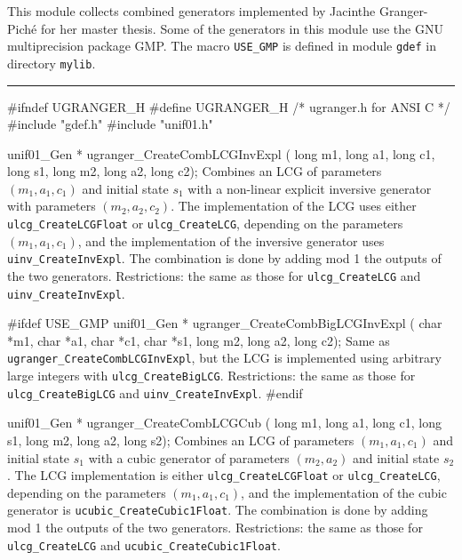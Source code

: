 
This module collects combined generators implemented by
Jacinthe Granger-Pich\'e for her master thesis. 
Some of the generators in this module use the GNU multiprecision package GMP. 
The macro {\tt USE\_GMP} is defined in module {\tt gdef} in directory
{\tt mylib}. %


\bigskip
\hrule
\code\hide
#ifndef UGRANGER_H
#define UGRANGER_H
/* ugranger.h for ANSI C */
\endhide
#include "gdef.h"
#include "unif01.h"


unif01_Gen * ugranger_CreateCombLCGInvExpl (
   long m1, long a1, long c1, long s1, long m2, long a2, long c2);
\endcode
 \tab
   Combines an  LCG of parameters $(m_1, a_1, c_1)$ and initial
   state $s_1$ with a non-linear explicit  inversive  generator  
   with parameters $(m_2, a_2, c_2)$. The implementation of the LCG uses either
   {\tt ulcg\_CreateLCGFloat} or {\tt ulcg\_CreateLCG},
   depending on the parameters
   $(m_1, a_1, c_1)$, and the implementation of the inversive generator uses 
   {\tt uinv\_CreateInvExpl}. The combination is done by adding mod 1 the
   outputs of the two generators.
   Restrictions: the same as those for {\tt ulcg\_CreateLCG} and
   {\tt uinv\_CreateInvExpl}.
 \endtab
\code


#ifdef USE_GMP
   unif01_Gen * ugranger_CreateCombBigLCGInvExpl (
      char *m1, char *a1, char *c1, char *s1, long m2, long a2, long c2);
\endcode
 \tab 
   Same as {\tt ugranger\_CreateCombLCGInvExpl}, but the LCG is implemented 
   using arbitrary large integers with {\tt ulcg\_CreateBigLCG}.  
   Restrictions: the same as those for {\tt ulcg\_CreateBigLCG} and
   {\tt uinv\_CreateInvExpl}.  
 \endtab
\code
#endif


unif01_Gen * ugranger_CreateCombLCGCub (
   long m1, long a1, long c1, long s1, long m2, long a2, long s2);
\endcode
 \tab Combines an LCG of parameters $(m_1, a_1, c_1)$ and initial
   state $s_1$ with a  cubic generator of parameters $(m_2, a_2)$ and
   initial state $s_2$. The  LCG implementation is either
   {\tt ulcg\_CreateLCGFloat} or {\tt ulcg\_CreateLCG}, depending on the
   parameters $(m_1, a_1, c_1)$, and the implementation of the
   cubic generator is {\tt ucubic\_CreateCubic1Float}.
   The combination is done by adding mod 1 the outputs of the two generators.
   Restrictions: the same as those for {\tt ulcg\_CreateLCG} and
   {\tt ucubic\_CreateCubic1Float}.
 \endtab
\code


